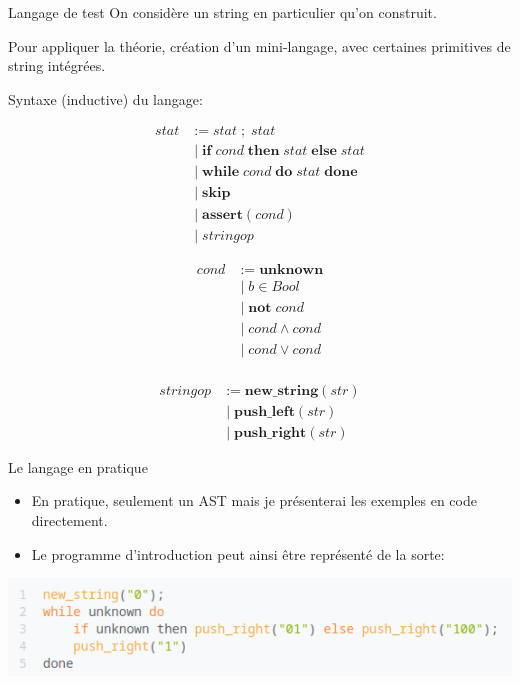 \documentclass{beamer}
\begin{document}
\begin{frame}{Langage de test}
  On considère un string en particulier qu'on construit.
  
  Pour appliquer la théorie, création d'un mini-langage, avec certaines primitives de string intégrées.
  
  Syntaxe (inductive) du langage:

  \begin{minipage}{1.5in}
    \begin{align*}
      stat &:= stat\; \mathbf{;}\; stat \\
      &\;|\; \mathbf{if}\; cond\; \mathbf{then}\; stat\; \mathbf{else}\; stat \\
      &\;|\; \mathbf{while}\; cond\; \mathbf{do}\; stat\; \mathbf{done} \\
      &\;|\; \mathbf{skip} \\
      &\;|\; \mathbf{assert}(cond) \\
      &\;|\; stringop
    \end{align*}
  \end{minipage}
  \begin{minipage}{2.5in}
    \begin{align*}
      cond &:= \mathbf{unknown} \\
      &\;|\; b \in Bool \\
      &\;|\; \mathbf{not}\; cond \\
      &\;|\; cond \wedge cond \\
      &\;|\; cond \vee cond \\
    \end{align*}
  \end{minipage}
  \begin{minipage}{1.5in}
    \begin{align*}
      stringop &:=  \mathbf{new\_string}(str) \\
      &\;|\; \mathbf{push\_left}(str) \\
      &\;|\; \mathbf{push\_right}(str)
    \end{align*}
  \end{minipage}
\end{frame}

\begin{frame}{Le langage en pratique}
  \begin{itemize}
    \item En pratique, seulement un AST
      mais je présenterai les exemples en code directement.
    \item Le programme d'introduction peut ainsi être représenté de la sorte:
  \end{itemize}
  \begin{center}
    \includegraphics[width=\linewidth]{ prog1 }
  \end{center}
\end{frame}
\end{document}
